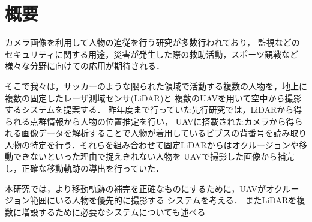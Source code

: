 \documentclass[autodetect-engine,dvipdfmx-if-dvi,ja=standard,a4j,jbase=11pt,magstyle=nomag*]{bxjsreport}
\begin{document}
\chapter*{概要}

カメラ画像を利用して人物の追従を行う研究が多数行われており，
監視などのセキュリティに関する用途，災害が発生した際の救助活動，スポーツ観戦など様々な分野に向けての応用が期待される．

そこで我々は，サッカーのような限られた領域で活動する複数の人物を，地上に複数の固定したレーザ測域センサ(LiDAR)と
複数のUAVを用いて空中から撮影するシステムを提案する．
昨年度まで行っていた先行研究では，LiDARから得られる点群情報から人物の位置推定を行い，
UAVに搭載されたカメラから得られる画像データを解析することで人物が着用しているビブスの背番号を読み取り
人物の特定を行う．それらを組み合わせて固定LiDARからはオクルージョンや移動できないといった理由で捉えきれない人物を
UAVで撮影した画像から補完し，正確な移動軌跡の導出を行っていた．

本研究では，より移動軌跡の補完を正確なものにするために，UAVがオクルージョン範囲にいる人物を優先的に撮影する
システムを考える．
またLiDARを複数に増設するために必要なシステムについても述べる
\end{document}
